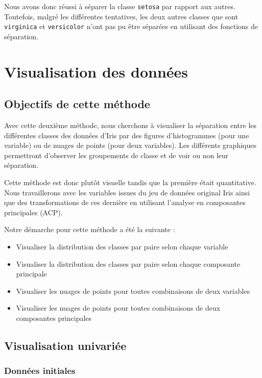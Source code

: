 \documentclass[french]{report}
\begin{document}
    Nous avons donc réussi à séparer la classe \texttt{setosa} par rapport aux autres. Toutefois, malgré les différentes tentatives, les deux autres classes que sont \texttt{virginica} et \texttt{versicolor} n'ont pas pu être séparées en utilisant des fonctions de séparation.
    
    
    \part{Visualisation des données}
    \chapter*{Objectifs de cette méthode}
    
    Avec cette deuxième méthode, nous cherchons à visualiser la séparation entre les différentes classes des données d'Iris par des figures d'histogrammes (pour une variable) ou de nuages de points (pour deux variables).
    Les différents graphiques permettront d'observer les groupements de classe et de voir ou non leur séparation.
    
    Cette méthode est donc plutôt visuelle tandis que la première était quantitative.
    Nous travaillerons avec les variables issues du jeu de données original Iris ainsi que des transformations de ces dernière en utilisant l'analyse en composantes principales (ACP).
    
    \noindent Notre démarche pour cette méthode a été la suivante :
    
    \begin{itemize}
        \item Visualiser la distribution des classes par paire selon chaque variable
        \item Visualiser la distribution des classes par paire selon chaque composante principale
        \item Visualiser les nuages de points pour toutes combinaisons de deux variables
        \item Visualiser les nuages de points pour toutes combinaisons de deux composantes principales
    \end{itemize}
    
    \chapter{Visualisation univariée}
    
    \section{Données initiales}
    
\end{document}
